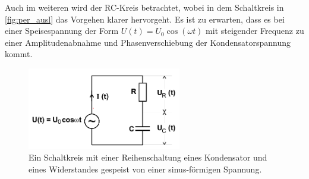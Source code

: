     Auch im weiteren wird der RC-Kreis betrachtet, wobei in dem Schaltkreis in \autoref{fig:per_ausl} das Vorgehen klarer hervorgeht. Es ist zu erwarten, dass es bei
    einer Speisespannung der Form $U(t) = U_0 \cos(\omega t)$ mit steigender Frequenz zu einer Amplitudenabnahme und Phasenverschiebung der Kondensatorspannung 
    kommt.

    \begin{figure}[H]
        \centering
        \includegraphics[width=0.6\textwidth]{bilder/periodische_Auslenkung.PNG}
        \caption{Ein Schaltkreis mit einer Reihenschaltung eines Kondensator und eines Widerstandes gespeist von einer sinus-förmigen Spannung. \cite{anleitung}}
        \label{fig:per_ausl}
    \end{figure}

